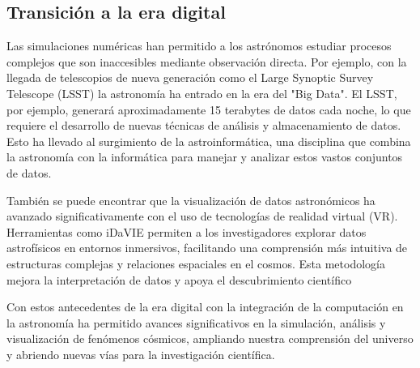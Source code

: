 \subsection*{Transición a la era digital}

Las simulaciones numéricas han permitido a los astrónomos estudiar procesos complejos que son inaccesibles mediante observación directa. 
Por ejemplo, con la llegada de telescopios de nueva generación como el Large Synoptic Survey Telescope (LSST) la astronomía ha entrado en la era del "Big Data". El LSST, por ejemplo, generará aproximadamente 15 terabytes de datos cada noche, lo que requiere el desarrollo de nuevas técnicas de análisis y almacenamiento de datos. Esto ha llevado al surgimiento de la astroinformática, una disciplina que combina la astronomía con la informática para manejar y analizar estos vastos conjuntos de datos\cite{huijse2014}.

También se puede encontrar que la visualización de datos astronómicos ha avanzado significativamente con el uso de tecnologías de realidad virtual (VR). Herramientas
como iDaVIE\cite{jarrett2021} permiten a los investigadores explorar datos astrofísicos en entornos inmersivos, facilitando una comprensión más intuitiva de estructuras complejas y relaciones espaciales en el cosmos. Esta metodología mejora la interpretación de datos y apoya el descubrimiento científico

Con estos antecedentes de la era digital con la integración de la computación en la astronomía ha permitido avances significativos en la simulación, análisis y visualización de fenómenos cósmicos, ampliando nuestra comprensión del universo y abriendo nuevas vías para la investigación científica.


